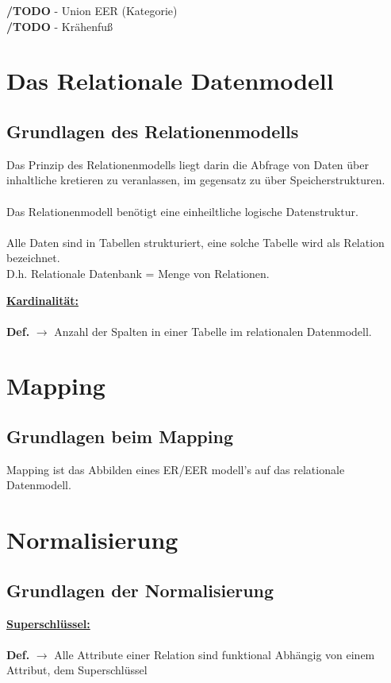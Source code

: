 \documentclass{article}
\newcommand{\Def}[2]{\indexspace\textbf{\underline{#1:}} \\ \\\textbf{Def.} $\rightarrow$ {#2}}
\newcommand{\TODO}[1]{\color{green} \textbf{/TODO} - {#1} \color{black}}
\begin{document}
    \noindent \TODO{Union EER (Kategorie)} \\
    \TODO{Krähenfuß} \\

    \newpage
    \section{Das Relationale Datenmodell}
    \subsection{Grundlagen des Relationenmodells}

    \noindent Das Prinzip des Relationenmodells liegt darin die Abfrage von Daten über inhaltliche kretieren zu veranlassen, im gegensatz zu über Speicherstrukturen. \\\\
    Das Relationenmodell benötigt eine einheiltliche logische Datenstruktur. \\ \\
    Alle Daten sind in Tabellen strukturiert, eine solche Tabelle wird als Relation bezeichnet.\\ D.h. Relationale Datenbank = Menge von Relationen.
    
    \Def{Kardinalität}{Anzahl der Spalten in einer Tabelle im relationalen Datenmodell.}
    \newpage
    \section{Mapping}
    \subsection{Grundlagen beim Mapping}

    \noindent Mapping ist das Abbilden eines ER/EER modell's auf das relationale Datenmodell.
    
    \newpage
    \section{Normalisierung}
    \subsection{Grundlagen der Normalisierung}
    \Def{Superschlüssel}{Alle Attribute einer Relation sind funktional Abhängig von einem Attribut, dem Superschlüssel}
\end{document}
